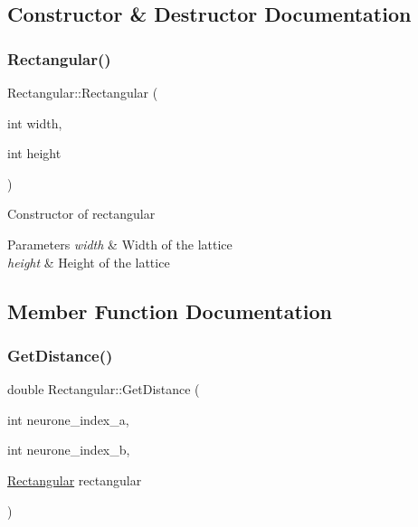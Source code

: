 \subsection{Constructor \& Destructor Documentation}
\mbox{\label{class_rectangular_a8fc2d25fc29143c6564448007c4725cf}} 
\subsubsection{\texorpdfstring{Rectangular()}{Rectangular()}}
{\footnotesize\ttfamily Rectangular\+::\+Rectangular (\begin{DoxyParamCaption}\item[{int}]{width,  }\item[{int}]{height }\end{DoxyParamCaption})}

Constructor of rectangular 
\begin{DoxyParams}{Parameters}
{\em width} & Width of the lattice \\
\hline
{\em height} & Height of the lattice \\
\hline
\end{DoxyParams}


\subsection{Member Function Documentation}
\mbox{\label{class_rectangular_a215357402c86908fffa815a8f164849e}} 
\subsubsection{\texorpdfstring{Get\+Distance()}{GetDistance()}}
{\footnotesize\ttfamily double Rectangular\+::\+Get\+Distance (\begin{DoxyParamCaption}\item[{int}]{neurone\+\_\+index\+\_\+a,  }\item[{int}]{neurone\+\_\+index\+\_\+b,  }\item[{\mbox{\hyperlink{class_rectangular}{Rectangular}}}]{rectangular }\end{DoxyParamCaption})\hspace{0.3cm}{\ttfamily [static]}}

